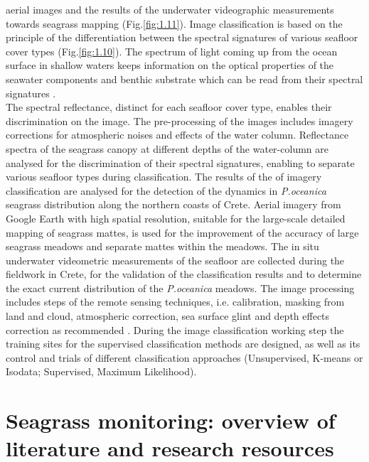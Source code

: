 \documentclass[10pt, a4paper]{article}
\begin{document}
aerial images and the results of the underwater videographic measurements towards seagrass
mapping  (Fig.\ref{fig:1.11}). Image classification is based on the principle of the differentiation between the spectral
signatures of various seafloor cover types  (Fig.\ref{fig:1.10}). The spectrum of light coming up from the ocean surface in
shallow waters keeps information on the optical properties of the seawater components and benthic
substrate which can be read from their spectral signatures \cite{Werdell03}\label{Werdell03}. \\
The spectral reflectance, distinct for each seafloor cover type, enables their discrimination on the image. The pre-processing
of the images includes imagery corrections for atmospheric noises and effects of the water
column. Reflectance spectra of the seagrass canopy at different depths of the water-column are
analysed for the discrimination of their spectral signatures, enabling to separate various seafloor types
during classification. The results of the of imagery classification are analysed for the detection of the
dynamics in \textit{P.oceanica} seagrass distribution along the northern coasts of Crete. Aerial imagery from
Google Earth with high spatial resolution, suitable for the large-scale detailed mapping of seagrass
mattes, is used for the improvement of the accuracy of large seagrass meadows and separate mattes
within the meadows. The in situ underwater videometric measurements of the seafloor are collected
during the fieldwork in Crete, for the validation of the classification results and to determine the exact
current distribution of the \textit{P.oceanica} meadows. The image processing includes steps of the remote
sensing techniques, i.e. calibration, masking from land and cloud, atmospheric correction, sea surface
glint and depth effects correction as recommended \cite{Matarrese08}\label{Matarrese08}. During the image classification
working step the training sites for the supervised classification methods are designed, as well as its
control and trials of different classification approaches (Unsupervised, K-means or Isodata;
Supervised, Maximum Likelihood).

\section[Overview of literature]{Seagrass monitoring: overview of literature and research resources} \label{sec:2}
\renewcommand{\headrulewidth}{0.4pt}
\end{document}

